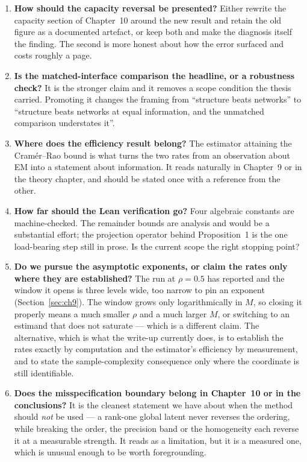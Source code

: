 \documentclass[11pt,a4paper]{article}
\newcommand{\hi}[1]{\textbf{#1}}
\begin{document}
\begin{enumerate}
\item \hi{How should the capacity reversal be presented?} Either rewrite the capacity section of
Chapter~10 around the new result and retain the old figure as a documented artefact, or keep both
and make the diagnosis itself the finding. The second is more honest about how the error surfaced
and costs roughly a page.

\item \hi{Is the matched-interface comparison the headline, or a robustness check?} It is the
stronger claim and it removes a scope condition the thesis carried. Promoting it changes the
framing from ``structure beats networks'' to ``structure beats networks at equal information, and
the unmatched comparison understates it''.

\item \hi{Where does the efficiency result belong?} The estimator attaining the Cram\'er--Rao bound
is what turns the two rates from an observation about EM into a statement about information. It
reads naturally in Chapter~9 or in the theory chapter, and should be stated once with a reference
from the other.

\item \hi{How far should the Lean verification go?} Four algebraic constants are machine-checked.
The remainder bounds are analysis and would be a substantial effort; the projection operator behind
Proposition~1 is the one load-bearing step still in prose. Is the current scope the right stopping
point?

\item \hi{Do we pursue the asymptotic exponents, or claim the rates only where they are
established?} The run at $\rho=0.5$ has reported and the window it opens is three levels wide, too
narrow to pin an exponent (Section~\ref{sec:ch9}). The window grows only logarithmically in $M$, so
closing it properly means a much smaller $\rho$ and a much larger $M$, or switching to an estimand
that does not saturate --- which is a different claim. The alternative, which is what the write-up
currently does, is to establish the rates exactly by computation and the estimator's efficiency by
measurement, and to state the sample-complexity consequence only where the coordinate is still
identifiable.
\item \hi{Does the misspecification boundary belong in Chapter~10 or in the conclusions?} It is
the cleanest statement we have about when the method should \emph{not} be used --- a rank-one
global latent never reverses the ordering, while breaking the order, the precision band or the
homogeneity each reverse it at a measurable strength. It reads as a limitation, but it is a
measured one, which is unusual enough to be worth foregrounding.
\end{enumerate}
\end{document}
